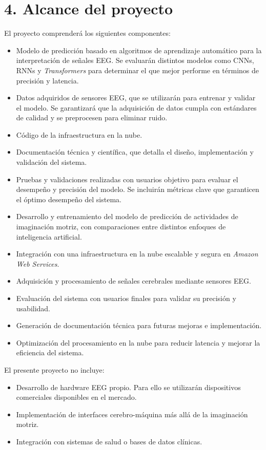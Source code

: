 \documentclass[
11pt, %
]{charter}
\begin{document}
\section{4. Alcance del proyecto}
\label{sec:alcance}

El proyecto comprenderá los siguientes componentes:
\begin{itemize}
	\item Modelo de predicción basado en algoritmos de aprendizaje automático para la interpretación de señales EEG. Se evaluarán distintos modelos como CNNs, RNNs y \textit{Transformers} para determinar el que mejor performe en términos de precisión y latencia.
	\item Datos adquiridos de sensores EEG, que se utilizarán para entrenar y validar el modelo. Se garantizará que la adquisición de datos cumpla con estándares de calidad y se preprocesen para eliminar ruido.
	\item Código de la infraestructura en la nube.
	\item Documentación técnica y científica, que detalla el diseño, implementación y validación del sistema.
	\item Pruebas y validaciones realizadas con usuarios objetivo para evaluar el desempeño y precisión del modelo. Se incluirán métricas clave que garanticen el óptimo desempeño del sistema.
	\item Desarrollo y entrenamiento del modelo de predicción de actividades de imaginación motriz, con comparaciones entre distintos enfoques de inteligencia artificial.
	\item Integración con una infraestructura en la nube escalable y segura en \textit{Amazon Web Services}.
	\item Adquisición y procesamiento de señales cerebrales mediante sensores EEG.
	\item Evaluación del sistema con usuarios finales para validar su precisión y usabilidad.
	\item Generación de documentación técnica para futuras mejoras e implementación.
	\item Optimización del procesamiento en la nube para reducir latencia y mejorar la eficiencia del sistema.
\end{itemize}
El presente proyecto no incluye:
\begin{itemize}
	\item Desarrollo de hardware EEG propio. Para ello se utilizarán dispositivos comerciales disponibles en el mercado.
	\item Implementación de interfaces cerebro-máquina más allá de la imaginación motriz.
	\item Integración con sistemas de salud o bases de datos clínicas.
\end{itemize}
\end{document}
